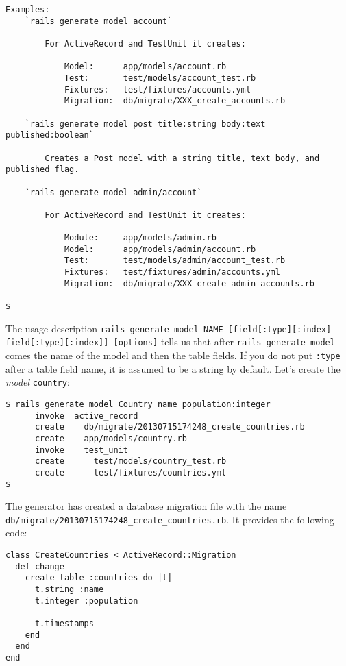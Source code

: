 \documentclass[a4paper]{book}
\newcounter{tab}[chapter]
\begin{document}
\begin{shaded}
\begin{verbatim}
Examples:
    `rails generate model account`

        For ActiveRecord and TestUnit it creates:

            Model:      app/models/account.rb
            Test:       test/models/account_test.rb
            Fixtures:   test/fixtures/accounts.yml
            Migration:  db/migrate/XXX_create_accounts.rb

    `rails generate model post title:string body:text published:boolean`

        Creates a Post model with a string title, text body, and published flag.

    `rails generate model admin/account`

        For ActiveRecord and TestUnit it creates:

            Module:     app/models/admin.rb
            Model:      app/models/admin/account.rb
            Test:       test/models/admin/account_test.rb
            Fixtures:   test/fixtures/admin/accounts.yml
            Migration:  db/migrate/XXX_create_admin_accounts.rb

$
\end{verbatim}\end{shaded}

The usage description \texttt{rails generate model NAME   {[}field{[}:type{]}{[}:index{]} field{[}:type{]}{[}:index{]}{]} {[}options{]}} tells us that after \texttt{rails generate model} comes the name of the model and then the table fields. If you do not put \texttt{:type} after a table field name, it is assumed to be a string by default. Let's create the \emph{model} \texttt{country}:

\begin{shaded}\begin{verbatim}
$ rails generate model Country name population:integer
      invoke  active_record
      create    db/migrate/20130715174248_create_countries.rb
      create    app/models/country.rb
      invoke    test_unit
      create      test/models/country_test.rb
      create      test/fixtures/countries.yml
$
\end{verbatim}\end{shaded}

The generator has created a database migration file with the name \texttt{db/migrate/20130715174248\_create\_countries.rb}. It provides the following code:

\begin{shaded}\begin{verbatim}
class CreateCountries < ActiveRecord::Migration
  def change
    create_table :countries do |t|
      t.string :name
      t.integer :population

      t.timestamps
    end
  end
end
\end{verbatim}\end{shaded}
\end{document}
